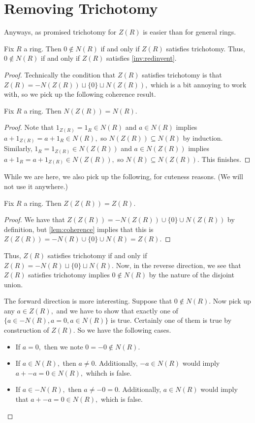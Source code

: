 \documentclass{article}
\begin{document}
\section{Removing Trichotomy}
Anyways, as promised trichotomy for $Z(R)$ is easier than for general rings.
\begin{proposition} \label{prop:easyinv1}
	Fix $R$ a ring. Then $0\notin N(R)$ if and only if $Z(R)$ satisfies trichotomy. Thus, $0\notin N(R)$ if and only if $Z(R)$ satisfies \autoref{inv:redinvent}.
\end{proposition}
\begin{proof}
	Technically the condition that $Z(R)$ satisfies trichotomy is that $Z(R)=-N(Z(R))\sqcup\{0\}\sqcup N(Z(R)),$ which is a bit annoying to work with, so we pick up the following coherence result.
	\begin{lemma} \label{lem:coherence}
		Fix $R$ a ring. Then $N(Z(R))=N(R).$
	\end{lemma}
	\begin{proof}
		Note that $1_{Z(R)}=1_R\in N(R)$ and $a\in N(R)$ implies $a+1_{Z(R)}=a+1_R\in N(R),$ so $N(Z(R))\subseteq N(R)$ by induction. Similarly, $1_R=1_{Z(R)}\in N(Z(R))$ and $a\in N(Z(R))$ implies $a+1_R=a+1_{Z(R)}\in N(Z(R)),$ so $N(R)\subseteq N(Z(R)).$ This finishes.
	\end{proof}
	While we are here, we also pick up the following, for cuteness reasons. (We will not use it anywhere.)
	\begin{corollary}
		Fix $R$ a ring. Then $Z(Z(R))=Z(R).$
	\end{corollary}
	\begin{proof}
		We have that $Z(Z(R))=-N(Z(R))\cup\{0\}\cup N(Z(R))$ by definition, but \autoref{lem:coherence} implies that this is $Z(Z(R))=-N(R)\cup\{0\}\cup N(R)=Z(R)$.
	\end{proof}
	Thus, $Z(R)$ satisfies trichotomy if and only if $Z(R)=-N(R)\sqcup\{0\}\sqcup N(R).$ Now, in the reverse direction, we see that $Z(R)$ satisfies trichotomy implies $0\notin N(R)$ by the nature of the disjoint union.

	The forward direction is more interesting. Suppose that $0\notin N(R).$ Now pick up any $a\in Z(R),$ and we have to show that exactly one of $\{a\in-N(R),a=0,a\in N(R)\}$ is true. Certainly one of them is true by construction of $Z(R).$ So we have the following cases.
	\begin{itemize}
		\item If $a=0,$ then we note $0=-0\notin N(R).$
		\item If $a\in N(R),$ then $a\ne0.$ Additionally, $-a\in N(R)$ would imply $a+-a=0\in N(R),$ whihch is false.
		\item If $a\in-N(R),$ then $a\ne-0=0.$ Additionally, $a\in N(R)$ would imply that $a+-a=0\in N(R),$ which is false.
		\qedhere
	\end{itemize}
\end{proof}
\end{document}
